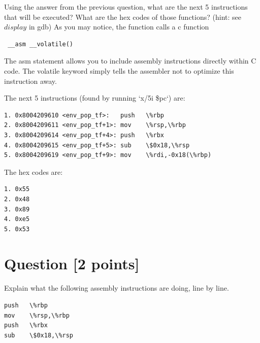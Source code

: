 \documentclass[11pt]{article}
\begin{document}
Using the answer from the previous question, what are the next 5 instructions that will be executed? 
What are the hex codes of those functions? (hint: see $display$ in gdb)
As you may notice, the function calls a c function 
\begin{verbatim} __asm __volatile() \end{verbatim}
The asm statement allows you to include assembly instructions directly within C code. 
The volatile keyword simply tells the assembler not to optimize this instruction away.

\begin{solution}
The next 5 instructions (found by running `x/5i \$pc`) are:

\begin{BVerbatim}
1. 0x8004209610 <env_pop_tf>:   push   \%rbp
2. 0x8004209611 <env_pop_tf+1>: mov    \%rsp,\%rbp
3. 0x8004209614 <env_pop_tf+4>: push   \%rbx
4. 0x8004209615 <env_pop_tf+5>: sub    \$0x18,\%rsp
5. 0x8004209619 <env_pop_tf+9>: mov    \%rdi,-0x18(\%rbp)
\end{BVerbatim}

The hex codes are:

\begin{BVerbatim}
1. 0x55
2. 0x48
3. 0x89
4. 0xe5
5. 0x53
\end{BVerbatim}
\end{solution}


\section{Question [2 points]}

Explain what the following assembly instructions are doing, line by line.

\begin{center}
\begin{BVerbatim}
push   \%rbp
mov    \%rsp,\%rbp
push   \%rbx
sub    \$0x18,\%rsp
\end{BVerbatim}
\end{center}
\end{document}
